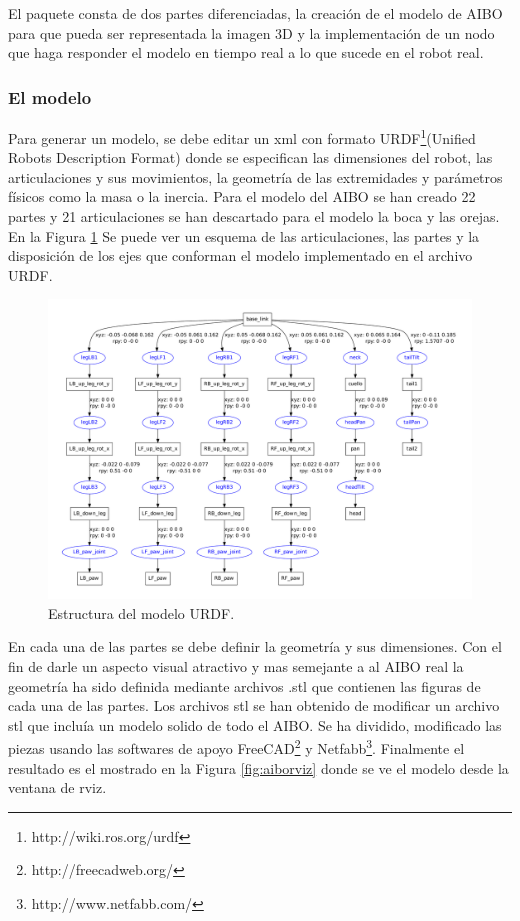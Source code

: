 \documentclass[12pt,a4paper,final,twoside]{article}
\begin{document}
El paquete consta de dos partes diferenciadas, la creación de el modelo de AIBO para que pueda ser representada la imagen 3D y la implementación de un nodo que haga responder el modelo en tiempo real a lo que sucede en el robot real.

\subsubsection{El modelo}
Para generar un modelo, se debe editar un xml con formato URDF\footnote{http://wiki.ros.org/urdf}(Unified Robots Description Format) donde se especifican las dimensiones del robot, las articulaciones y sus movimientos, la geometría de las extremidades y parámetros físicos como la masa o la inercia.
Para el modelo del AIBO se han creado 22 partes y 21 articulaciones se han descartado para el modelo la boca y las orejas. En la Figura \ref{fig:aibourdf} Se puede ver un esquema de las articulaciones, las partes y la disposición de los ejes que conforman el modelo implementado en el archivo URDF.


\begin{figure}[H]
	\centering
    \includegraphics[scale=0.39]{images/Aibo.pdf}
	 \caption{Estructura del modelo URDF.}
  \label{fig:aibourdf}
\end{figure}

En  cada una de las partes se debe definir la geometría y sus dimensiones. Con el fin de darle un aspecto visual atractivo y mas semejante a al AIBO real la geometría ha sido  definida mediante archivos .stl que contienen las figuras de cada una de las partes. Los archivos stl se han obtenido de modificar un archivo stl que incluía un modelo solido de todo el AIBO. Se ha dividido, modificado las piezas usando las softwares de apoyo FreeCAD\footnote{http://freecadweb.org/} y Netfabb\footnote{http://www.netfabb.com/}. Finalmente el resultado es el mostrado en la Figura \ref{fig:aiborviz} donde se ve el modelo desde la ventana de rviz.
 
\end{document}
